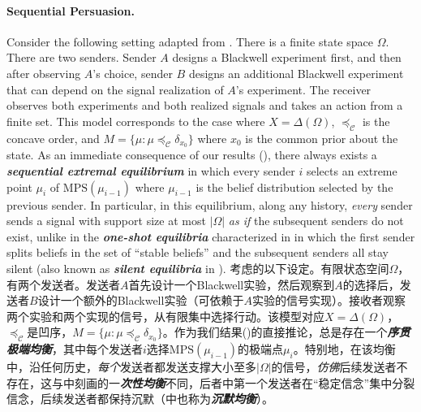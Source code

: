 \documentclass[12pt,letterpaper]{article}
\newenvironment{original}{\color{black}}{}
\newenvironment{translation}{\color{blue}}{}
\theoremstyle{plain}
\theoremstyle{definition}
\theoremstyle{remark}
\newcommand{\C}{\mathcal{C}}
\theoremstyle{definition}
\begin{document}
\paragraph{Sequential Persuasion.}\hspace{-2mm}
\begin{original}
Consider the following setting adapted from \citet{LiNorman2021SequentialPersuasion}. There is a finite state space $\Omega$. There are two senders. Sender $A$ designs a Blackwell experiment first, and then after observing $A$'s choice, sender $B$ designs an additional Blackwell experiment that can depend on the signal realization of $A$'s experiment. The receiver observes both experiments and both realized signals and takes an action from a finite set. This model corresponds to the case where $X = \Delta(\Omega)$, $\preceq_\C$ is the concave order, and $M = \{\mu: \mu \preceq_\C \delta_{x_0}\}$ where $x_0$ is the common prior about the state. As an immediate consequence of our results (), there always exists a \textit{\textbf{sequential extremal equilibrium}} in which every sender $i$ selects an extreme point $\mu_i$ of $\text{MPS}(\mu_{i-1})$ where $\mu_{i-1}$ is the belief distribution selected by the previous sender. In particular, in this equilibrium, along any history, \textit{every} sender sends a signal with support size at most $|\Omega|$ \textit{as if} the subsequent senders do not exist, unlike in the \textit{\textbf{one-shot equilibria}} characterized in \citet{LiNorman2021SequentialPersuasion} in which the first sender splits beliefs in the set of ``stable beliefs'' and the subsequent senders all stay silent (also known as \textit{\textbf{silent equilibria}} in \citealt{wu2023sequential}).
\end{original}
\begin{translation}
考虑\citet{LiNorman2021SequentialPersuasion}的以下设定。有限状态空间$\Omega$，有两个发送者。发送者$A$首先设计一个Blackwell实验，然后观察到$A$的选择后，发送者$B$设计一个额外的Blackwell实验（可依赖于$A$实验的信号实现）。接收者观察两个实验和两个实现的信号，从有限集中选择行动。该模型对应$X = \Delta(\Omega)$，$\preceq_\C$是凹序，$M = \{\mu: \mu \preceq_\C \delta_{x_0}\}$。作为我们结果()的直接推论，总是存在一个\textit{\textbf{序贯极端均衡}}，其中每个发送者$i$选择$\text{MPS}(\mu_{i-1})$的极端点$\mu_i$。特别地，在该均衡中，沿任何历史，\textit{每个}发送者都发送支撑大小至多$|\Omega|$的信号，\textit{仿佛}后续发送者不存在，这与\citet{LiNorman2021SequentialPersuasion}中刻画的一\textit{\textbf{次性均衡}}不同，后者中第一个发送者在``稳定信念''集中分裂信念，后续发送者都保持沉默（\citealt{wu2023sequential}中也称为\textit{\textbf{沉默均衡}}）。
\end{translation}
\end{document}
